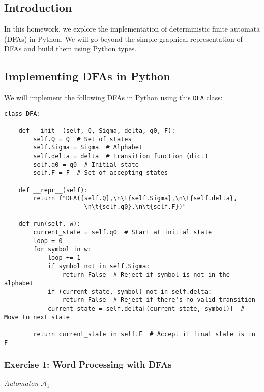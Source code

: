 \documentclass{article}
\theoremstyle{theorem}
\theoremstyle{definition}
\theoremstyle{remark}
\begin{document}
\subsection{Introduction}
In this homework, we explore the implementation of deterministic finite automata (DFAs) in Python. We will go beyond the simple graphical representation of DFAs and build them using Python types.

\subsection{Implementing DFAs in Python}
We will implement the following DFAs in Python using this \texttt{DFA} class:

\begin{verbatim}
class DFA:

    def __init__(self, Q, Sigma, delta, q0, F):
        self.Q = Q  # Set of states
        self.Sigma = Sigma  # Alphabet
        self.delta = delta  # Transition function (dict)
        self.q0 = q0  # Initial state
        self.F = F  # Set of accepting states

    def __repr__(self):
        return f"DFA({self.Q},\n\t{self.Sigma},\n\t{self.delta},
                      \n\t{self.q0},\n\t{self.F})"

    def run(self, w):
        current_state = self.q0  # Start at initial state
        loop = 0
        for symbol in w:
            loop += 1
            if symbol not in self.Sigma:
                return False  # Reject if symbol is not in the alphabet
            if (current_state, symbol) not in self.delta:
                return False  # Reject if there's no valid transition
            current_state = self.delta[(current_state, symbol)]  # Move to next state
        
        return current_state in self.F  # Accept if final state is in F
\end{verbatim}

\subsubsection{Exercise 1: Word Processing with DFAs}
\begin{center}

\textit{Automaton \(\mathcal{A}_1\)}
\end{center}
\end{document}
